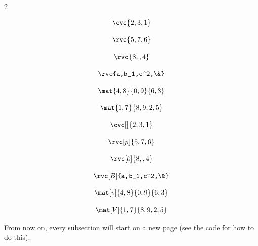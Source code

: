 \documentclass{article}
\begin{document}
\vspace{5pt}

\begin{multicols}{2}
\begin{verbbox}
$$\cvc{2,3,1}$$
\end{verbbox}

\begin{verbbox}
$$\rvc{5,7,6}$$
\end{verbbox}

\begin{verbbox}
$$\rvc{8,,4}$$
\end{verbbox}

\begin{verbbox}
$$\rvc{a,b_1,c^2,\&}$$
\end{verbbox}

\begin{verbbox}
$$\mat{4,8}{0,9}{6,3}$$
\end{verbbox}

\begin{verbbox}
$$\mat{1,7}{8,9,2,5}$$
\end{verbbox}
\begin{verbbox}
$$\cvc[]{2,3,1}$$
\end{verbbox}

\begin{verbbox}
$$\rvc[p]{5,7,6}$$
\end{verbbox}

\begin{verbbox}
$$\rvc[b]{8,,4}$$
\end{verbbox}

\begin{verbbox}
$$\rvc[B]{a,b_1,c^2,\&}$$
\end{verbbox}

\begin{verbbox}
$$\mat[v]{4,8}{0,9}{6,3}$$
\end{verbbox}

\begin{verbbox}
$$\mat[V]{1,7}{8,9,2,5}$$
\end{verbbox}
\end{multicols}

\vspace{15pt}

{\sffamily From now on, every subsection will start on a new page (see the code for how to do this).}
\end{document}
